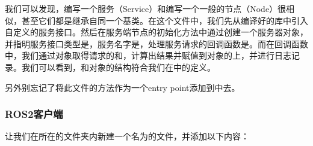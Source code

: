 \documentclass[letterpaper,10pt,english]{sphinxmanual}
\begin{document}
\sphinxAtStartPar
我们可以发现，编写一个服务（Service）和编写一个一般的节点（Node）很相似，甚至它们都是继承自同一个基类。在这个文件中，我们先从编译好的库中引入自定义的服务接口。然后在服务端节点的初始化方法中通过创建一个服务器对象，并指明服务接口类型是，服务名字是，处理服务请求的回调函数是。而在回调函数中，我们通过对象取得请求的和，计算出结果并赋值到对象的上，并进行日志记录。我们可以看到，和对象的结构符合我们在中的定义。

\sphinxAtStartPar
另外别忘记了将此文件的方法作为一个entry
point添加到中去。

\begin{sphinxVerbatim}[commandchars=\\\{\}]
\end{sphinxVerbatim}


\subsubsection{ROS2客户端}
\label{\detokenize{chapter_rl_sys/ros_code_ex:id12}}
\sphinxAtStartPar
让我们在所在的文件夹内新建一个名为的文件，并添加以下内容：
\end{document}
